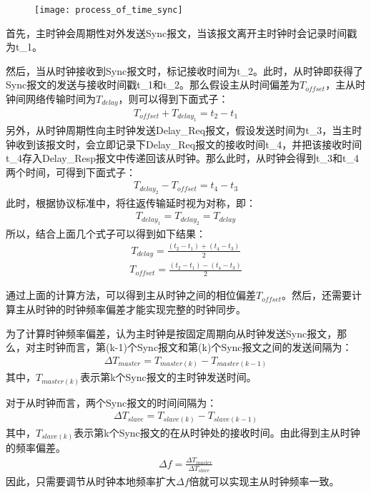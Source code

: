 \begin{figure}[!hbp]
  \centering
  \begin{minipage}[b]{0.6\textwidth}
    \captionstyle{\centering}
    \centering
    \texttt{[image: process\_of\_time\_sync]}
  \end{minipage}     
\end{figure}

首先，主时钟会周期性对外发送Sync报文，当该报文离开主时钟时会记录时间戳为t\_1。

然后，当从时钟接收到Sync报文时，标记接收时间为t\_2。此时，从时钟即获得了Sync报文的发送与接收时间戳t\_1和t\_2。那么假设主从时间偏差为$T_{offset}$，主从时钟间网络传输时间为$T_{delay}$，则可以得到下面式子：
\begin{align}
	T_{offset} + T_{delay_1} = t_2 - t_1
\end{align}
另外，从时钟周期性向主时钟发送Delay\_Req报文，假设发送时间为t\_3，当主时钟收到该报文时，会立即记录下Delay\_Req报文的接收时间t\_4，并把该接收时间t\_4存入Delay\_Resp报文中传递回该从时钟。那么此时，从时钟会得到t\_3和t\_4两个时间，可得到下面式子：
\begin{align}
	T_{delay_2} - T_{offset} = t_4 - t_3
\end{align}
此时，根据协议标准中，将往返传输延时视为对称，即：
\begin{align}
	T_{delay_1} = T_{delay_2} = T_{delay}
\end{align}
所以，结合上面几个式子可以得到如下结果：
\begin{align}
	T_{delay} = \frac{(t_2 - t_1) + (t_4 - t_3)}{2}
\end{align}
\begin{align}
	T_{offset} = \frac{(t_2 - t_1) - (t_4 - t_3)}{2}
\end{align}

通过上面的计算方法，可以得到主从时钟之间的相位偏差$T_{offset}$。然后，还需要计算主从时钟的时钟频率偏差才能实现完整的时钟同步。

为了计算时钟频率偏差，认为主时钟是按固定周期向从时钟发送Sync报文，那么，对主时钟而言，第(k-1)个Sync报文和第(k)个Sync报文之间的发送间隔\supercite{6}为：
\begin{align}
	\Delta T_{master} = T_{master(k)} - T_{master(k - 1)}
\end{align}
其中，$T_{master(k)}$表示第k个Sync报文的主时钟发送时间。

对于从时钟而言，两个Sync报文的时间间隔\supercite{6}为：
\begin{align}
	\Delta T_{slave} = T_{slave(k)} - T_{slave(k - 1)}
\end{align}
其中，$T_{slave(k)}$表示第k个Sync报文的在从时钟处的接收时间。由此得到主从时钟的频率偏差。
\begin{align}
	\Delta f = \frac{\Delta T_{master}}{\Delta T_{slave}}
\end{align}
因此，只需要调节从时钟本地频率扩大$\Delta f$倍就可以实现主从时钟频率一致。

